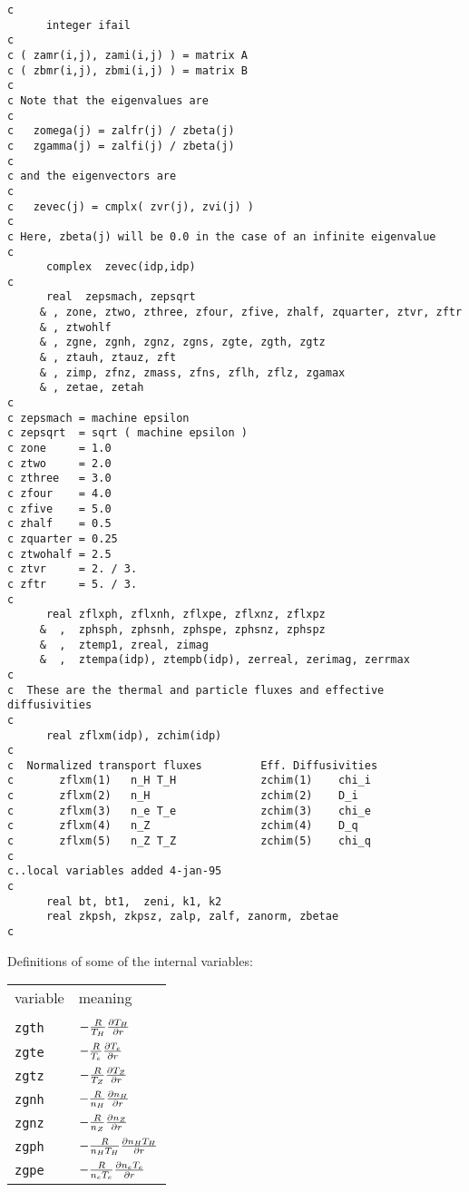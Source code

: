 \begin{verbatim}
c
      integer ifail
c
c ( zamr(i,j), zami(i,j) ) = matrix A
c ( zbmr(i,j), zbmi(i,j) ) = matrix B
c
c Note that the eigenvalues are
c
c   zomega(j) = zalfr(j) / zbeta(j)
c   zgamma(j) = zalfi(j) / zbeta(j)
c
c and the eigenvectors are
c
c   zevec(j) = cmplx( zvr(j), zvi(j) )
c
c Here, zbeta(j) will be 0.0 in the case of an infinite eigenvalue
c
      complex  zevec(idp,idp)
c
      real  zepsmach, zepsqrt
     & , zone, ztwo, zthree, zfour, zfive, zhalf, zquarter, ztvr, zftr
     & , ztwohlf
     & , zgne, zgnh, zgnz, zgns, zgte, zgth, zgtz
     & , ztauh, ztauz, zft
     & , zimp, zfnz, zmass, zfns, zflh, zflz, zgamax
     & , zetae, zetah
c
c zepsmach = machine epsilon
c zepsqrt  = sqrt ( machine epsilon )
c zone     = 1.0
c ztwo     = 2.0
c zthree   = 3.0
c zfour    = 4.0
c zfive    = 5.0
c zhalf    = 0.5
c zquarter = 0.25
c ztwohalf = 2.5
c ztvr     = 2. / 3.
c zftr     = 5. / 3.
c
      real zflxph, zflxnh, zflxpe, zflxnz, zflxpz
     &  ,  zphsph, zphsnh, zphspe, zphsnz, zphspz
     &  ,  ztemp1, zreal, zimag
     &  ,  ztempa(idp), ztempb(idp), zerreal, zerimag, zerrmax
c
c  These are the thermal and particle fluxes and effective diffusivities
c
      real zflxm(idp), zchim(idp)
c
c  Normalized transport fluxes         Eff. Diffusivities
c       zflxm(1)   n_H T_H             zchim(1)    chi_i                
c       zflxm(2)   n_H                 zchim(2)    D_i
c       zflxm(3)   n_e T_e             zchim(3)    chi_e
c       zflxm(4)   n_Z                 zchim(4)    D_q
c       zflxm(5)   n_Z T_Z             zchim(5)    chi_q
c
c..local variables added 4-jan-95
c
      real bt, bt1,  zeni, k1, k2
      real zkpsh, zkpsz, zalp, zalf, zanorm, zbetae
c
\end{verbatim}

Definitions of some of the internal variables:

\renewcommand{\arraystretch}{1.4}
\begin{center}
\begin{tabular}{lp{4.0in}}
variable & meaning \\
\\
{\tt zgth} & $ - \frac{R}{T_H} \frac{\partial T_H}{\partial r} $ \\
{\tt zgte} & $ - \frac{R}{T_e} \frac{\partial T_e}{\partial r} $ \\
{\tt zgtz} & $ - \frac{R}{T_Z} \frac{\partial T_Z}{\partial r} $ \\
{\tt zgnh} & $ - \frac{R}{n_H} \frac{\partial n_H}{\partial r} $ \\
{\tt zgnz} & $ - \frac{R}{n_Z} \frac{\partial n_Z}{\partial r} $ \\
{\tt zgph} & $ - \frac{R}{n_H T_H} \frac{\partial n_H T_H}{\partial r} $ \\
{\tt zgpe} & $ - \frac{R}{n_e T_e} \frac{\partial n_e T_e}{\partial r} $ \\
\end{tabular}  \end{center}

